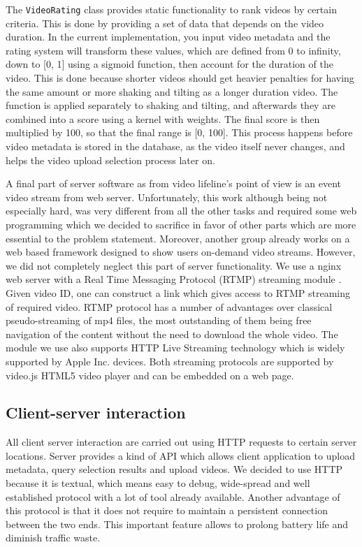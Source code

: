 \documentclass[conference]{IEEEtran}
\begin{document}
The \texttt{VideoRating} class provides static functionality to rank videos by certain criteria. This is done by providing
a set of data that depends on the video duration. In the current implementation, you input video metadata and the
rating system will transform these values, which are defined from 0 to infinity, down to [0, 1] using a sigmoid function,
then account for the duration of the video. This is done because shorter videos should get heavier penalties for
having the same amount or more shaking and tilting as a longer duration video. The function is applied separately to
shaking and tilting, and afterwards they are combined into a score using a kernel with weights. The final score is
then multiplied by 100, so that the final range is [0, 100]. This process happens before video metadata is stored
in the database, as the video itself never changes, and helps the video upload selection process later on.

A final part of server software as from video lifeline's point of view is an event video stream from web server.
Unfortunately, this work although being not especially hard, was very different from all the other tasks and
required some web programming which we decided to sacrifice in favor of other parts which are more essential to the problem statement.
Moreover, another group already works on a web based framework designed to show users on-demand video streams.
However, we did not completely neglect this part of server functionality. 
We use a nginx \cite{nginx} web server with a Real Time Messaging Protocol (RTMP) streaming module \cite{nginx-rtmp-module}.
Given video ID, one can construct a link which gives access to RTMP streaming of required video.
RTMP protocol has a number of advantages over classical pseudo-streaming of mp4 files, the most outstanding of them being
free navigation of the content without the need to download the whole video.
The module we use also supports HTTP Live Streaming technology \cite{apple-hls} which is widely supported by Apple Inc. devices.
Both streaming protocols are supported by video.js \cite{video-js} HTML5 video player and can be embedded on a web page.

\subsection{Client-server interaction}

All client server interaction are carried out using HTTP requests to certain server locations.
Server provides a kind of API which allows client application to upload metadata, query selection results and upload videos.
We decided to use HTTP because it is textual, which means easy to debug, 
wide-spread and well established protocol with a lot of tool already available. 
Another advantage of this protocol is that it does not require to maintain a persistent connection between the two ends.
This important feature allows to prolong battery life and diminish traffic waste.
\end{document}
